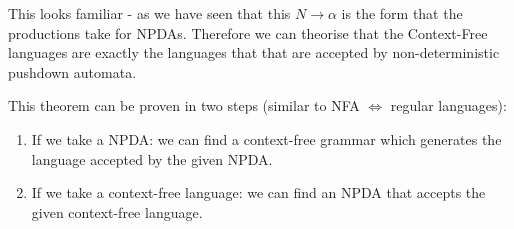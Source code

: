 This looks familiar - as we have seen that this $N \rightarrow \alpha$ is the form that the productions take for NPDAs. Therefore we can theorise that the Context-Free languages are exactly the languages that that are accepted by non-deterministic pushdown automata.

This theorem can be proven in two steps (similar to NFA $\Leftrightarrow$ regular languages):
\begin{enumerate}
    \item If we take a NPDA: we can find a context-free grammar which generates the language accepted by the given NPDA.
    \item If we take a context-free language: we can find an NPDA that accepts the given context-free language.
\end{enumerate}

